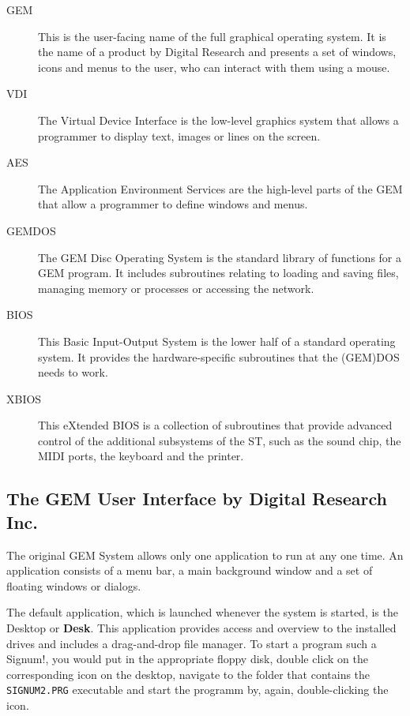 \begin{description}
    \item[GEM] This is the user-facing name of the full graphical operating system. It is the name of a product by Digital Research and presents a set of windows, icons and menus to the user, who can interact with them using a mouse.
    \item[VDI] The Virtual Device Interface is the low-level graphics system that allows a programmer to display text, images or lines on the screen.
    \item[AES] The Application Environment Services are the high-level parts of the GEM that allow a programmer to define windows and menus.
    \item[GEMDOS] The GEM Disc Operating System is the standard library of functions for a GEM program. It includes subroutines relating to loading and saving files, managing memory or processes or accessing the network.
    \item[BIOS] This Basic Input-Output System is the lower half of a standard operating system. It provides the hardware-specific subroutines that the (GEM)DOS needs to work.
    \item[XBIOS] This eXtended BIOS is a collection of subroutines that provide advanced control of the additional subsystems of the ST, such as the sound chip, the MIDI ports, the keyboard and the printer.
\end{description}

\subsection{The GEM User Interface by Digital Research Inc.}

The original GEM System allows only one application to run at any one time. An application consists of a menu bar, a main background window and a set of floating windows or dialogs.

The default application, which is launched whenever the system is started, is the Desktop or \textbf{Desk}. This application provides access and overview to the installed drives and includes a drag-and-drop file manager. To start a program such a Signum!, you would put in the appropriate floppy disk, double click on the corresponding icon on the desktop, navigate to the folder that contains the \texttt{SIGNUM2.PRG} executable and start the programm by, again, double-clicking the icon.

